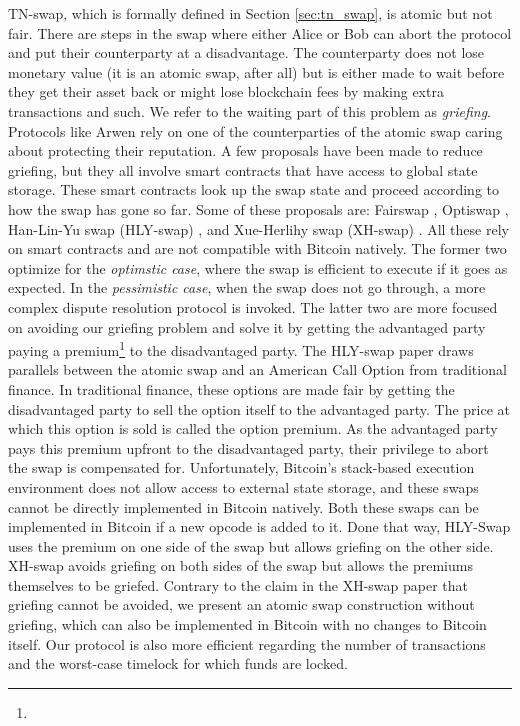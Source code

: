 TN-swap, which is formally defined in Section \ref{sec:tn_swap}, is atomic but not fair. There are steps in the swap where either Alice or Bob can abort the protocol and put their counterparty at a disadvantage. The counterparty does not lose monetary value (it is an atomic swap, after all) but is either made to wait before they get their asset back or might lose blockchain fees by making extra transactions and such. We refer to the waiting part of this problem as \textit{griefing}. Protocols like Arwen \cite{arwen_protocol} rely on one of the counterparties of the atomic swap caring about protecting their reputation. A few proposals have been made to reduce griefing, but they all involve smart contracts that have access to global state storage. These smart contracts look up the swap state and proceed according to how the swap has gone so far. Some  of these proposals are: Fairswap \cite{fairswap}, Optiswap \cite{optiswap}, Han-Lin-Yu swap (HLY-swap) \cite{atomic_swaps_american_call_options}, and Xue-Herlihy swap (XH-swap) \cite{xue_herlihy_swap}. All these rely on smart contracts and are not compatible with Bitcoin natively. The former two optimize for the \textit{optimstic case}, where the swap is efficient to execute if it goes as expected. In the \textit{pessimistic case}, when the swap does not go through, a more complex dispute resolution protocol is invoked. The latter two are more focused on avoiding our griefing problem and solve it by getting the advantaged party paying a premium\footnote{} to the disadvantaged party. The HLY-swap paper draws parallels between the atomic swap and an American Call Option from traditional finance. In traditional finance, these options are made fair by getting the disadvantaged party to sell the option itself to the advantaged party. The price at which this option is sold is called the option premium. As the advantaged party pays this premium upfront to the disadvantaged party, their privilege to abort the swap is compensated for. Unfortunately, Bitcoin's stack-based execution environment does not allow access to external state storage, and these swaps cannot be directly implemented in Bitcoin natively. Both these swaps can be implemented in Bitcoin if a new opcode is added to it. Done that way, HLY-Swap uses the premium on one side of the swap but allows griefing on the other side. XH-swap avoids griefing on both sides of the swap but allows the premiums themselves to be griefed. Contrary to the claim in the XH-swap paper that griefing cannot be avoided, we present an atomic swap construction without griefing, which can also be implemented in Bitcoin with no changes to Bitcoin itself. Our protocol is also more efficient regarding the number of transactions and the worst-case timelock for which funds are locked.

